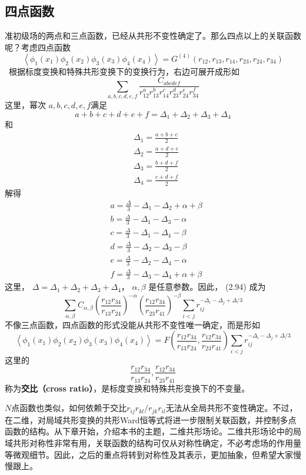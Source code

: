 \subsection{四点函数}
准初级场的两点和三点函数，已经从共形不变性确定了。那么四点以上的关联函数呢？考虑四点函数
\begin{equation}
		\left\langle\phi_{1}\left(x_{1}\right) \phi_{2}\left(x_{2}\right) \phi_{3}\left(x_{3}\right) \phi_{4}\left(x_{4}\right)\right\rangle=G^{(4)}\left(r_{12}, r_{13}, r_{14}, r_{23}, r_{24}, r_{34}\right)
\end{equation}\
根据标度变换和特殊共形变换下的变换行为，右边可展开成形如
\begin{equation}
	\sum_{a, b, c, d, e, f} \frac{C_{a b c d e f}}{r_{12}^{a} r_{13}^{b} r_{14}^{c} r_{23}^{d} r_{24}^{e} r_{34}^{f}}
\end{equation}
这里，幂次 $a,b,c,d,e,f $满足
\begin{equation}
	a+b+c+d+e+f=\Delta_{1}+\Delta_{2}+\Delta_{3}+\Delta_{4}
\end{equation}
和
\begin{align} &\Delta_{1}=\frac{a+b+c}{2}\\ &\Delta_{2}=\frac{a+d+e}{2}\\ &\Delta_{3}=\frac{b+d+f}{2}\\ &\Delta_{4}=\frac{c+d+f}{2} \end{align}
解得
\begin{align} &a=\frac{\Delta}{3}-\Delta_{1}-\Delta_{2}+\alpha+\beta\\ &b=\frac{\Delta}{3}-\Delta_{1}-\Delta_{3}-\alpha\\ &c=\frac{\Delta}{3}-\Delta_{1}-\Delta_{4}-\beta\\ &d=\frac{\Delta}{3}-\Delta_{2}-\Delta_{3}-\beta\\ &e=\frac{\Delta}{3}-\Delta_{2}-\Delta_{4}-\alpha\\ &f=\frac{\Delta}{3}-\Delta_{3}-\Delta_{4}+\alpha+\beta \end{align}
这里， $\Delta=\Delta_1+\Delta_2+\Delta_3+\Delta_4 $， $\alpha,\beta$ 是任意参数。因此， (2.94) 成为
\begin{equation}
	\sum_{\alpha, \beta} C_{\alpha, \beta}\left(\frac{r_{12} r_{34}}{r_{13} r_{24}}\right)^{-\alpha}\left(\frac{r_{12} r_{34}}{r_{23} r_{41}}\right)^{-\beta} \sum_{i<j} r_{i j}^{-\Delta_{i}-\Delta_{j}+\Delta / 3}
\end{equation}
不像三点函数，四点函数的形式没能从共形不变性唯一确定，而是形如
\begin{equation}
	\left\langle\phi_{1}\left(x_{1}\right) \phi_{2}\left(x_{2}\right) \phi_{3}\left(x_{3}\right) \phi_{4}\left(x_{4}\right)\right\rangle=F\left(\frac{r_{12} r_{34}}{r_{13} r_{24}}, \frac{r_{12} r_{34}}{r_{23} r_{41}}\right) \sum_{i<j} r_{i j}^{-\Delta_{i}-\Delta_{j}+\Delta / 3}
\end{equation}
这里的
\[
\frac{r_{12} r_{34}}{r_{13} r_{24}}, \frac{r_{12} r_{34}}{r_{23} r_{41}}\]
称为\textbf{交比（cross ratio）}，是标度变换和特殊共形变换下的不变量。

$N $点函数也类似，如何依赖于交比$r_{ij}r_{kl}/r_{jk}r_{il} $无法从全局共形不变性确定。不过，在二维，对局域共形变换的共形Ward恒等式将进一步限制关联函数，并控制多点函数的结构。从下章开始，介绍本书的主题，二维共形场论。二维共形场论中的局域共形对称性非常有用，关联函数的结构可仅从对称性确定，不必考虑场的作用量等微观细节。因此，之后的重点将转到对称性及其表示，更加抽象，但希望大家慢慢跟上。



